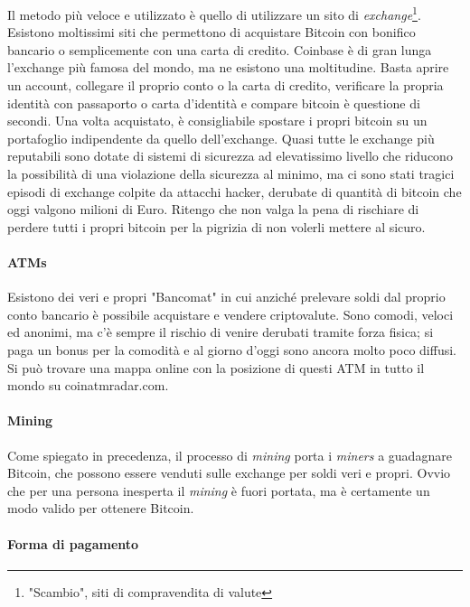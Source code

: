 \documentclass {article}
\begin{document}
Il metodo più veloce e utilizzato è quello di utilizzare un sito di \textit{exchange}\footnote{"Scambio", siti di compravendita di valute}. Esistono moltissimi siti che permettono di acquistare Bitcoin con bonifico bancario o semplicemente con una carta di credito.
Coinbase è di gran lunga l'exchange più famosa del mondo, ma ne esistono una moltitudine.
Basta aprire un account, collegare il proprio conto o la carta di credito, verificare la propria identità con passaporto o carta d'identità e compare bitcoin è questione di secondi.
Una volta acquistato, è consigliabile spostare i propri bitcoin su un portafoglio indipendente da quello dell'exchange.
Quasi tutte le exchange più reputabili sono dotate di sistemi di sicurezza ad elevatissimo livello che riducono la possibilità di una violazione della sicurezza al minimo, ma ci sono stati tragici episodi di exchange colpite da attacchi hacker, derubate di quantità di bitcoin che oggi valgono milioni di Euro.
Ritengo che non valga la pena di rischiare di perdere tutti i propri bitcoin per la pigrizia di non volerli mettere al sicuro.

\paragraph {ATMs}

Esistono dei veri e propri "Bancomat" in cui anziché prelevare soldi dal proprio conto bancario è possibile acquistare e vendere criptovalute.
Sono comodi, veloci ed anonimi, ma c'è sempre il rischio di venire derubati tramite forza fisica; si paga un bonus per la comodità e al giorno d'oggi sono ancora molto poco diffusi.
Si può trovare una mappa online con la posizione di questi ATM in tutto il mondo su coinatmradar.com.

\paragraph {Mining}

Come spiegato in precedenza, il processo di \textit{mining} porta i \textit{miners} a guadagnare Bitcoin, che possono essere venduti sulle exchange per soldi veri e propri.
Ovvio che per una persona inesperta il \textit{mining} è fuori portata, ma è certamente un modo valido per ottenere Bitcoin.

\paragraph {Forma di pagamento}
\end{document}
